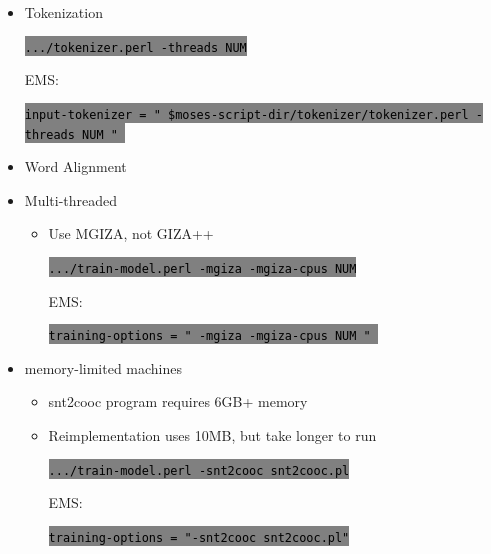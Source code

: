\documentclass[landscape]{uedslides2C}
\newcommand{\littlecode}[1]{\colorbox{gray}{\textcolor{black}{\small \tt #1}}}
\begin{document}


\begin{itemize} \itemsep -1mm

\item {Tokenization}
  \begin{center}
    \littlecode{.../tokenizer.perl -threads NUM}
  \end{center}      
    EMS: 
  \begin{center}
    \littlecode{input-tokenizer  = " \$moses-script-dir/tokenizer/tokenizer.perl -threads NUM " }
  \end{center}      
  
  
\end{itemize}
  


\begin{itemize} \itemsep -1mm

\item {Word Alignment}
\item {Multi-threaded}
  \begin{itemize}
  \item    Use MGIZA, not GIZA++
  \begin{center}
    \littlecode{.../train-model.perl -mgiza -mgiza-cpus NUM} 
  \end{center}      
  EMS: 
  \begin{center}
    \littlecode{training-options = " -mgiza -mgiza-cpus NUM " } 
  \end{center}      
  \end{itemize}

\item {memory-limited machines}
  \begin{itemize}
  \item snt2cooc program requires 6GB+ memory
  \item Reimplementation uses 10MB, but take longer to run
  \begin{center}
    \littlecode{.../train-model.perl -snt2cooc snt2cooc.pl} 
  \end{center}      
  EMS:
  \begin{center}
    \littlecode{training-options = "-snt2cooc snt2cooc.pl"}
  \end{center}      

  \end{itemize}
\end{itemize}
       
\end{document}
